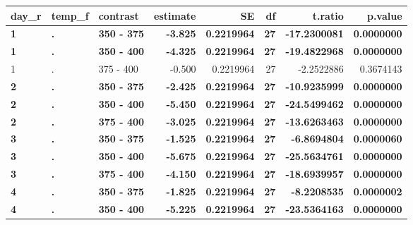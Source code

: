 \documentclass[12pt,]{article}
\begin{document}
\begin{table}[H]
\centering\begingroup\fontsize{8}{10}\selectfont

\begin{tabular}{l|l|l|r|r|r|r|r}
\hline
day\_r & temp\_f & contrast & estimate & SE & df & t.ratio & p.value\\
\hline
\rowcolor[HTML]{EAFAF1}  \textbf{1} & \textbf{.} & \textbf{350 - 375} & \textbf{-3.825} & \textbf{0.2219964} & \textbf{27} & \textbf{-17.2300081} & \textbf{0.0000000}\\
\hline
\rowcolor[HTML]{EAFAF1}  \textbf{1} & \textbf{.} & \textbf{350 - 400} & \textbf{-4.325} & \textbf{0.2219964} & \textbf{27} & \textbf{-19.4822968} & \textbf{0.0000000}\\
\hline
1 & . & 375 - 400 & -0.500 & 0.2219964 & 27 & -2.2522886 & 0.3674143\\
\hline
\rowcolor[HTML]{EAFAF1}  \textbf{2} & \textbf{.} & \textbf{350 - 375} & \textbf{-2.425} & \textbf{0.2219964} & \textbf{27} & \textbf{-10.9235999} & \textbf{0.0000000}\\
\hline
\rowcolor[HTML]{EAFAF1}  \textbf{2} & \textbf{.} & \textbf{350 - 400} & \textbf{-5.450} & \textbf{0.2219964} & \textbf{27} & \textbf{-24.5499462} & \textbf{0.0000000}\\
\hline
\rowcolor[HTML]{EAFAF1}  \textbf{2} & \textbf{.} & \textbf{375 - 400} & \textbf{-3.025} & \textbf{0.2219964} & \textbf{27} & \textbf{-13.6263463} & \textbf{0.0000000}\\
\hline
\rowcolor[HTML]{EAFAF1}  \textbf{3} & \textbf{.} & \textbf{350 - 375} & \textbf{-1.525} & \textbf{0.2219964} & \textbf{27} & \textbf{-6.8694804} & \textbf{0.0000060}\\
\hline
\rowcolor[HTML]{EAFAF1}  \textbf{3} & \textbf{.} & \textbf{350 - 400} & \textbf{-5.675} & \textbf{0.2219964} & \textbf{27} & \textbf{-25.5634761} & \textbf{0.0000000}\\
\hline
\rowcolor[HTML]{EAFAF1}  \textbf{3} & \textbf{.} & \textbf{375 - 400} & \textbf{-4.150} & \textbf{0.2219964} & \textbf{27} & \textbf{-18.6939957} & \textbf{0.0000000}\\
\hline
\rowcolor[HTML]{EAFAF1}  \textbf{4} & \textbf{.} & \textbf{350 - 375} & \textbf{-1.825} & \textbf{0.2219964} & \textbf{27} & \textbf{-8.2208535} & \textbf{0.0000002}\\
\hline
\rowcolor[HTML]{EAFAF1}  \textbf{4} & \textbf{.} & \textbf{350 - 400} & \textbf{-5.225} & \textbf{0.2219964} & \textbf{27} & \textbf{-23.5364163} & \textbf{0.0000000}\\

\end{tabular}
\end{table}
\end{document}
